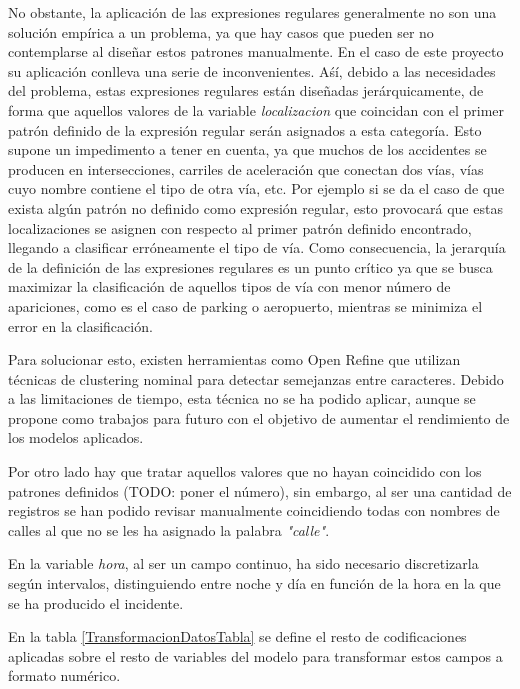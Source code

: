 \begin{enumerate}
                    No obstante, la aplicación de las expresiones regulares generalmente no son una solución empírica a un problema, ya que hay casos que pueden ser no contemplarse al diseñar estos patrones manualmente. En el caso de este proyecto su aplicación conlleva una serie de inconvenientes. Aśí, debido a las necesidades del problema, estas expresiones regulares están diseñadas jerárquicamente, de forma que aquellos valores de la variable \textit{localizacion} que coincidan con el primer patrón definido de la expresión regular serán asignados a esta categoría. Esto supone un impedimento a tener en cuenta, ya que muchos de los accidentes se producen en intersecciones, carriles de aceleración que conectan dos vías, vías cuyo nombre contiene el tipo de otra vía, etc. Por ejemplo si se da el caso de que exista algún patrón no definido como expresión regular, esto provocará que estas localizaciones se asignen con respecto al primer patrón definido encontrado, llegando a clasificar erróneamente el tipo de vía. Como consecuencia, la jerarquía de la definición de las expresiones regulares es un punto crítico ya que se busca maximizar la clasificación de aquellos tipos de vía con menor número de apariciones, como es el caso de parking o aeropuerto, mientras se minimiza el error en la clasificación.


                    Para solucionar esto, existen herramientas como Open Refine \cite{OpenRefine} que utilizan técnicas de clustering nominal para detectar semejanzas entre caracteres. Debido a las limitaciones de tiempo, esta técnica no se ha podido aplicar, aunque se propone como trabajos para futuro con el objetivo de aumentar el rendimiento de los modelos aplicados.

                    Por otro lado hay que tratar aquellos valores que no hayan coincidido con los patrones definidos (TODO: poner el número), sin embargo, al ser una cantidad de registros se han podido revisar manualmente coincidiendo todas con nombres de calles al que no se les ha asignado la palabra \textit{"calle"}.

                    En la variable \textit{hora}, al ser un campo continuo, ha sido necesario discretizarla según intervalos, distinguiendo entre noche y día en función de la hora en la que se ha producido el incidente.


                    En la tabla \ref{TransformacionDatosTabla} se define el resto de codificaciones aplicadas sobre el resto de variables del modelo para transformar estos campos a formato numérico.


\end{enumerate}
